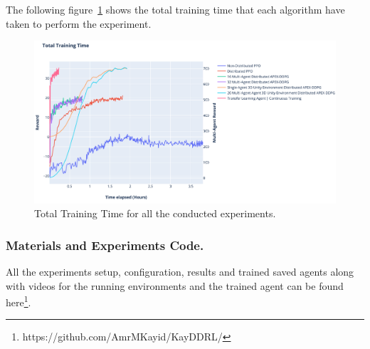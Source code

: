 The following figure~\ref{fig:exps_time} shows the total training time that each algorithm have taken to perform the experiment.

\begin{figure}[!htb]
    \centering
    \includegraphics[width=\linewidth]{figures/exps/time.png}
    \caption{Total Training Time for all the conducted experiments.}
    \label{fig:exps_time}
\end{figure}

\subsubsection{Materials and Experiments Code.}
All the experiments setup, configuration, results and trained saved agents along with videos for the running environments and the trained agent can be found here\footnote{https://github.com/AmrMKayid/KayDDRL/}.
